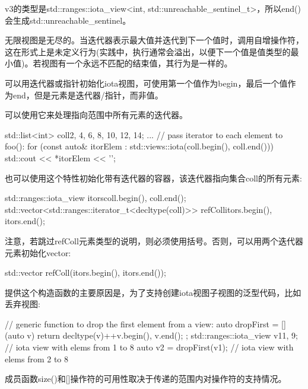 v3的类型是std::ranges::iota\_view<int, std::unreachable\_sentinel\_t>，所以end()会生成std::unreachable\_sentinel。

无限视图是无尽的。当迭代器表示最大值并迭代到下一个值时，调用自增操作符，这在形式上是未定义行为(实践中，执行通常会溢出，以便下一个值是值类型的最小值)。若视图有一个永远不匹配的结束值，其行为是一样的。


可以用迭代器或指针初始化iota视图，可使用第一个值作为begin，最后一个值作为end，但是元素是迭代器/指针，而非值。

可以使用它来处理指向范围中所有元素的迭代器。

\begin{cpp}
std::list<int> coll{2, 4, 6, 8, 10, 12, 14};
...
// pass iterator to each element to foo():
for (const auto& itorElem : std::views::iota(coll.begin(), coll.end())) {
	std::cout << *itorElem << '\n';
}
\end{cpp}

也可以使用这个特性初始化带有迭代器的容器，该迭代器指向集合coll的所有元素:

\begin{cpp}
std::ranges::iota_view itors{coll.begin(), coll.end()};
std::vector<std::ranges::iterator_t<decltype(coll)>> refColl{itors.begin(),
	itors.end()};
\end{cpp}

注意，若跳过refColl元素类型的说明，则必须使用括号。否则，可以用两个迭代器元素初始化vector:

\begin{cpp}
std::vector refColl(itors.begin(), itors.end());
\end{cpp}

提供这个构造函数的主要原因是，为了支持创建iota视图子视图的泛型代码，比如丢弃视图:

\begin{cpp}
// generic function to drop the first element from a view:
auto dropFirst = [] (auto v) {
						return decltype(v){++v.begin(), v.end()};
					};
std::ranges::iota_view v1{1, 9}; // iota view with elems from 1 to 8
auto v2 = dropFirst(v1); // iota view with elems from 2 to 8
\end{cpp}

成员函数size()和[]操作符的可用性取决于传递的范围内对操作符的支持情况。


